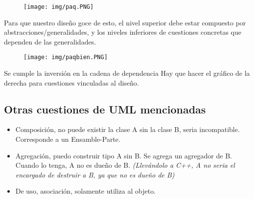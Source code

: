 \begin{figure}[!htb]
    \centering
    \texttt{[image: img/paq.PNG]}
\end{figure}

Para que nuestro diseño goce de esto, el nivel superior debe estar compuesto por abstracciones/generalidades, y los niveles inferiores de cuestiones concretas que dependen de las generalidades. 

\begin{figure}[!htb]
    \centering
    \texttt{[image: img/paqbien.PNG]}
\end{figure}

Se cumple la inversión en la cadena de dependencia
Hay que hacer el gráfico de la derecha para cuestiones vinculadas al diseño. %

\subsection*{Otras cuestiones de UML mencionadas}
\begin{itemize}
\item Composición, no puede existir la clase A sin la clase B, seria incompatible. Corresponde a un Ensamble-Parte.
\item Agregación, puedo construir tipo A sin B. Se agrega un agregador de B. Cuando lo tenga, A no es dueño de B.\textit{ (Llevándolo a C++, A no seria el encargado de destruir a B, ya que no es dueño de B)}
\item De uso, asociación, solamente utiliza al objeto.
\end{itemize}

